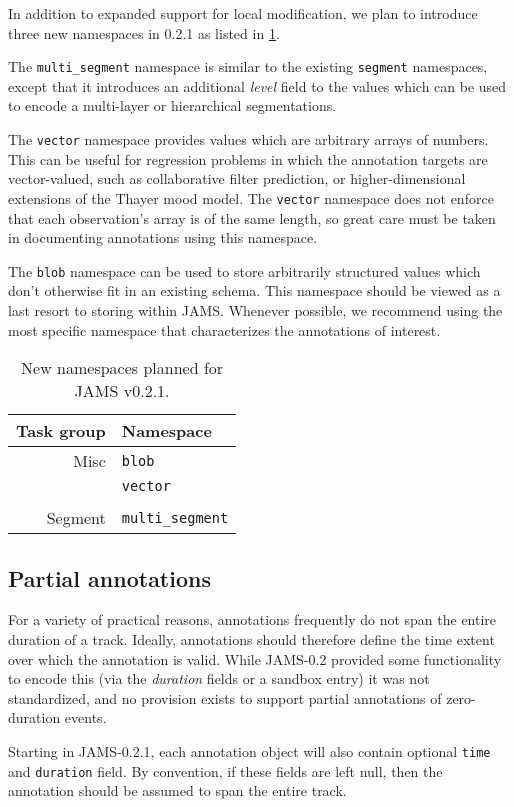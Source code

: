 \documentclass{article}
\begin{document}
In addition to expanded support for local modification, we plan to introduce three new
namespaces in 0.2.1 as listed in \cref{tab:namespaces:0.2.1}.

The \texttt{multi\_segment} namespace is similar to the existing \texttt{segment} 
namespaces, except that it introduces an additional \emph{level} field to the values
which can be used to encode a multi-layer or hierarchical segmentations.

The \texttt{vector} namespace provides values which are arbitrary arrays of numbers.
This can be useful for regression problems in which the annotation targets are
vector-valued, such as collaborative filter prediction, or higher-dimensional 
extensions of the Thayer mood model.  The \texttt{vector} namespace does not enforce that
each observation's array is of the same length, so great care must be taken in
documenting annotations using this namespace.

The \texttt{blob} namespace can be used to store arbitrarily structured values which
don't otherwise fit in an existing schema.  This namespace should be viewed as a last
resort to storing within JAMS.  Whenever possible, we recommend using the most specific
namespace that characterizes the annotations of interest.

\begin{table}
    \caption{New namespaces planned for JAMS v0.2.1.}\label{tab:namespaces:0.2.1}
    \centering
    \begin{tabular}{rl}
    \toprule
    Task group                  & Namespace\\
    \midrule
    Misc       & \texttt{blob}\\
                                & \texttt{vector}\\
                                \\
    Segment                     & \texttt{multi\_segment}\\
    \bottomrule
    \end{tabular}
\end{table}


\subsection{Partial annotations}
For a variety of practical reasons, annotations frequently do not span the entire
duration of a track.  Ideally, annotations should therefore define the time extent over
which the annotation is valid.  While JAMS-0.2 provided some functionality to encode this
(via the \emph{duration} fields or a sandbox entry) it was not standardized, and no
provision exists to support partial annotations of zero-duration events.

Starting in JAMS-0.2.1, each annotation object will also contain optional \texttt{time} and
\texttt{duration} field.  By convention, if these fields are left null, then the
annotation should be assumed to span the entire track.





\end{document}
